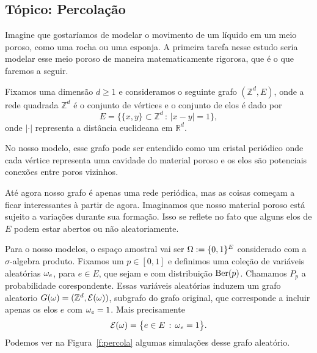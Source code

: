 \begin{topics}
\section{Tópico: Percolação}
\label{s:percolacao}

Imagine que gostaríamos de modelar o movimento de um líquido em um meio poroso, como uma rocha ou uma esponja.
A primeira tarefa nesse estudo seria modelar esse meio poroso de maneira matematicamente rigorosa, que é o que faremos a seguir.

Fixamos uma dimensão $d \geq 1$ e consideramos o seguinte grafo $(\mathbb{Z}^d, E)$,
onde a rede quadrada $\mathbb{Z}^d$ é o conjunto de vértices e o conjunto de elos é dado por
\begin{equation*}
  E = \big\{ \{x, y\} \subset \mathbb{Z}^d \, : \,  |x - y| = 1 \},
\end{equation*}
onde $|\cdot|$ representa a distância euclideana em $\mathbb{R}^d$.

No nosso modelo, esse grafo pode ser entendido como um cristal periódico onde cada vértice representa uma cavidade do material poroso e os elos são potenciais conexões entre poros vizinhos.

Até agora nosso grafo é apenas uma rede periódica, mas as coisas começam a ficar interessantes à partir de agora.
Imaginamos que nosso material poroso está sujeito a variações durante sua formação.
Isso se reflete no fato que alguns elos de $E$ podem estar abertos ou não aleatoriamente.

Para o nosso modelos, o espaço amostral vai ser $\Omega:= \{0,1\}^E$ considerado com a $\sigma$-algebra produto.
Fixamos um $p \in [0,1]$ e definimos uma coleção de variáveis aleatórias $\omega_e$, para $e \in E$, que sejam \iid e com distribuição $\operatorname{Ber}(p)$.
Chamamos $P_p$ a probabilidade corespondente.
Essas variáveis aleatórias induzem um grafo aleatorio $G(\omega)=(\mathbb{Z}^d, \mathcal{E}(\omega))$, subgrafo do grafo original,
que corresponde a incluir apenas os elos $e$ com $\omega_e = 1$.
Mais precisamente
\begin{equation}
  \mathcal{E}(\omega) = \big\{ e \in E\, : \, \omega_e = 1 \big\}.
\end{equation}
Podemos ver na Figura~\ref{f:percola} algumas simulações desse grafo aleatório.


\end{topics}
